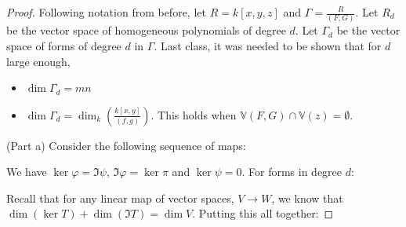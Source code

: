 \documentclass{report}
\begin{document}
\begin{proof}
    Following notation from before, let $R = k[x, y, z]$ and $\Gamma = \frac{ R}{(F, G)}$. Let $R_{d}$ be the vector space of homogeneous polynomials of degree $d$. Let $\Gamma_{ d}$ be the vector space of forms of degree $d$ in $\Gamma$. Last class, it was needed to be shown that for $d$ large enough, 
        \begin{itemize}
            \item $\dim \Gamma_{ d} = mn$

            \item $\dim \Gamma_{ d} = \dim_{ k}\left(\frac{k[x, y]}{(f, g)}\right)$. This holds when $\mathbb{V}(F, G) \cap \mathbb{ V}(z) = \emptyset$.  
        \end{itemize}
    (Part a) Consider the following sequence of maps:
        \begin{center}
        \end{center}
    We have $\ker{\varphi} = \Im{\psi}$, $\Im{\varphi} = \ker{\pi}$ and $\ker{\psi} = 0$. For forms in degree $d$:
        \begin{center}
        \end{center}
    Recall that for any linear map of vector spaces, $V \rightarrow W$, we know that $\dim ( \ker{T}) + \dim ( \Im{T}) = \dim V$. Putting this all together:


\end{proof}
\end{document}
